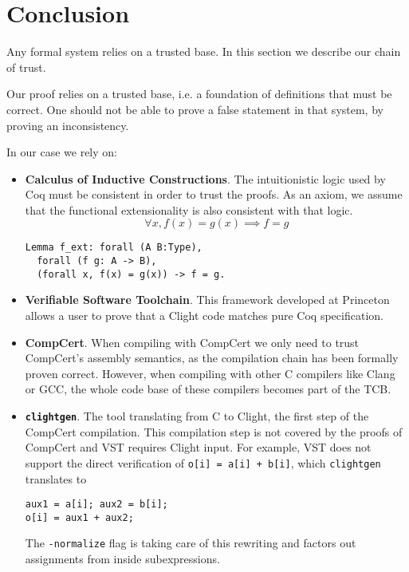 \section{Conclusion}
\label{sec:Conclusion}

Any formal system relies on a trusted base. In this section we describe our
chain of trust.

Our proof relies on a trusted base, i.e. a foundation of definitions that must be
correct. One should not be able to prove a false statement in that system, \eg by
proving an inconsistency.

In our case we rely on:
\begin{itemize}
  \item \textbf{Calculus of Inductive Constructions}. The intuitionistic logic
        used by Coq must be consistent in order to trust the proofs. As an axiom,
        we assume that the functional extensionality is also consistent with that logic.
        $$\forall x, f(x) = g(x) \implies f = g$$
        \begin{lstlisting}[language=Coq,belowskip=-0.25 \baselineskip]
Lemma f_ext: forall (A B:Type),
  forall (f g: A -> B),
  (forall x, f(x) = g(x)) -> f = g.
\end{lstlisting}

  \item \textbf{Verifiable Software Toolchain}. This framework developed at
        Princeton allows a user to prove that a Clight code matches pure Coq
        specification.

  \item \textbf{CompCert}. When compiling with CompCert we only need to trust
        CompCert's {assembly} semantics, as the compilation chain has been formally proven correct.
        However, when compiling with other C compilers like Clang or GCC, the
        whole code base of these compilers becomes part of the TCB.

  \item \textbf{\texttt{clightgen}}. The tool translating from {C} to
          {Clight}, the first step of the CompCert compilation.
          This compilation step is not covered by the proofs of CompCert
          and VST requires Clight input. For example, VST does not support the direct verification of 
          \texttt{o[i] = a[i] + b[i]}, which \texttt{clightgen} translates to
        \begin{lstlisting}[language=Ctweetnacl,stepnumber=0,belowskip=-0.5 \baselineskip]
aux1 = a[i]; aux2 = b[i];
o[i] = aux1 + aux2;
\end{lstlisting}
        The \texttt{-normalize} flag is taking care of this
        rewriting and factors out assignments from inside subexpressions.


\end{itemize}
